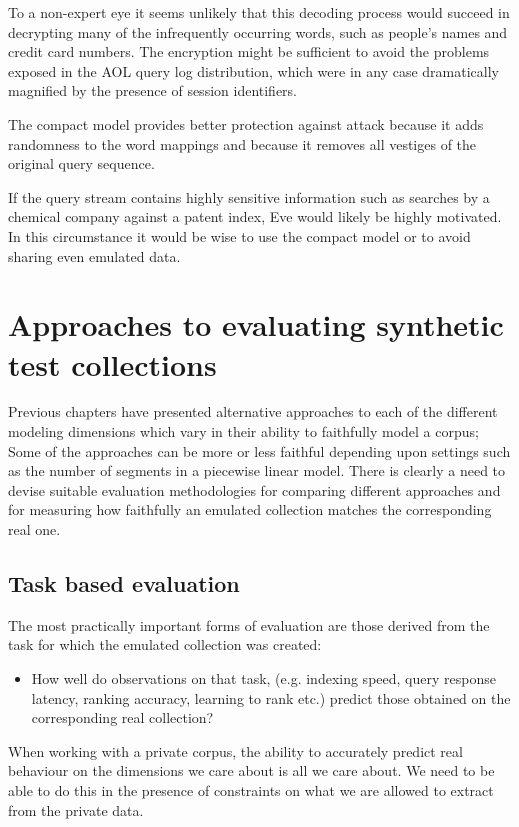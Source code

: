 \documentclass[11pt]{report}
\begin{document}
To a non-expert eye it seems unlikely that this decoding process would
succeed in decrypting many of the infrequently occurring
words, such as people's names and credit card numbers.   The
encryption might be sufficient to avoid the problems exposed in the
AOL query log distribution, which were in any case dramatically
magnified by the presence of session identifiers.

The compact model provides better protection against attack because
it adds randomness to the word mappings and because it removes all
vestiges of the original query sequence.

If the query stream contains highly sensitive information such as
searches by a chemical company against a patent index, Eve would likely be
highly motivated.  In this circumstance it would be wise to use the
compact model or to avoid
sharing even emulated data.



\chapter{Approaches to evaluating synthetic test collections}   %
\label{chap:SynEval}

Previous chapters have presented alternative approaches to each of the
different modeling dimensions which vary in their ability to
faithfully model a corpus; Some of the approaches can be more
or less faithful depending upon settings such as the number of segments
in a piecewise linear model. There is clearly a need to devise suitable evaluation methodologies
for comparing different approaches and for measuring how faithfully an emulated
collection matches the corresponding real one.


\section{Task based evaluation}
The most practically
important forms of evaluation are those derived from the task for
which the emulated collection was created:
\begin{itemize}
  \item How well do observations on that task, (e.g. indexing speed, query
    response latency, ranking accuracy, learning to rank etc.) predict those obtained
    on the corresponding real collection?
\end{itemize}

When working with a private corpus, the ability to accurately predict real
behaviour on the dimensions we care about is all we care about.  We
need to be able to do this in the presence of constraints on what we
are allowed to extract from the private data.
\end{document}
